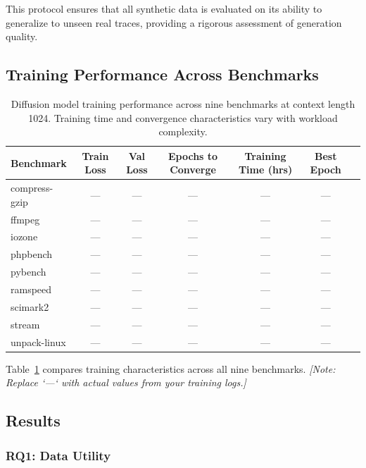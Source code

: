 This protocol ensures that all synthetic data is evaluated on its ability to generalize to unseen real traces, providing a rigorous assessment of generation quality.

\subsection{Training Performance Across Benchmarks}
\label{subsec:training}

\begin{table}[t]
\centering
\caption{Diffusion model training performance across nine benchmarks at context length 1024. Training time and convergence characteristics vary with workload complexity.}
\label{tab:training_performance}
\begin{tabular}{@{}lcccccc@{}}
\toprule
\textbf{Benchmark} & \textbf{Train Loss} & \textbf{Val Loss} & \textbf{Epochs to Converge} & \textbf{Training Time (hrs)} & \textbf{Best Epoch} \\
\midrule
compress-gzip   & --- & --- & --- & --- & --- \\
ffmpeg          & --- & --- & --- & --- & --- \\
iozone          & --- & --- & --- & --- & --- \\
phpbench        & --- & --- & --- & --- & --- \\
pybench         & --- & --- & --- & --- & --- \\
ramspeed        & --- & --- & --- & --- & --- \\
scimark2        & --- & --- & --- & --- & --- \\
stream          & --- & --- & --- & --- & --- \\
unpack-linux    & --- & --- & --- & --- & --- \\
\bottomrule
\end{tabular}
\end{table}

Table~\ref{tab:training_performance} compares training characteristics across all nine benchmarks. \textit{[Note: Replace `---` with actual values from your training logs.]}

\subsection{Results}
\label{subsec:results}

\subsubsection{RQ1: Data Utility}

